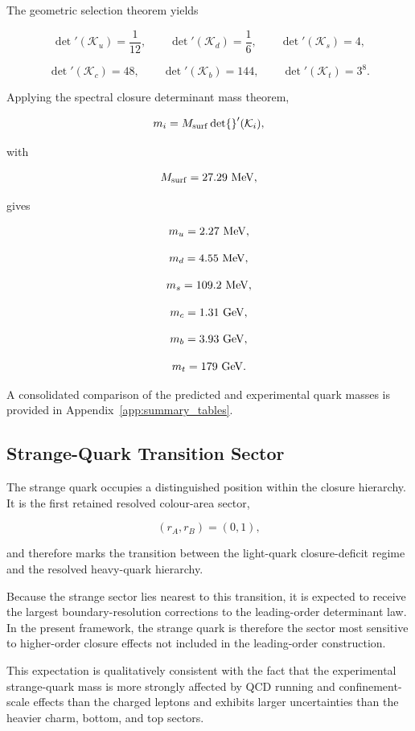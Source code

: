\documentclass[11pt]{article}
\theoremstyle{definition}
\theoremstyle{remark}
\begin{document}
The geometric selection theorem yields

\[
\det{}'(\mathcal K_u)=\frac1{12},
\qquad
\det{}'(\mathcal K_d)=\frac1{6},
\qquad
\det{}'(\mathcal K_s)=4,
\]

\[
\det{}'(\mathcal K_c)=48,
\qquad
\det{}'(\mathcal K_b)=144,
\qquad
\det{}'(\mathcal K_t)=3^8.
\]

Applying the spectral closure determinant mass theorem,

\[
m_i
=
M_{\rm surf}
\det{}'(\mathcal K_i),
\]

with

\[
M_{\rm surf}
=
27.29~{\rm MeV},
\]

gives

\[
m_u
=
2.27~{\rm MeV},
\]

\[
m_d
=
4.55~{\rm MeV},
\]

\[
m_s
=
109.2~{\rm MeV},
\]

\[
m_c
=
1.31~{\rm GeV},
\]

\[
m_b
=
3.93~{\rm GeV},
\]

\[
m_t
=
179~{\rm GeV}.
\]

A consolidated comparison of the predicted and experimental
quark masses is provided in
Appendix~\ref{app:summary_tables}.


\subsection{Strange-Quark Transition Sector}
\label{subsec:strange_quark_transition_sector}

The strange quark occupies a distinguished position within the
closure hierarchy. It is the first retained resolved
colour-area sector,

\begin{equation}
(r_A,r_B)=(0,1),
\end{equation}

and therefore marks the transition between the light-quark
closure-deficit regime and the resolved heavy-quark hierarchy.

Because the strange sector lies nearest to this transition, it
is expected to receive the largest boundary-resolution
corrections to the leading-order determinant law. In the
present framework, the strange quark is therefore the sector
most sensitive to higher-order closure effects not included in
the leading-order construction.

This expectation is qualitatively consistent with the fact that
the experimental strange-quark mass is more strongly affected by
QCD running and confinement-scale effects than the charged
leptons and exhibits larger uncertainties than the heavier
charm, bottom, and top sectors.
\end{document}
